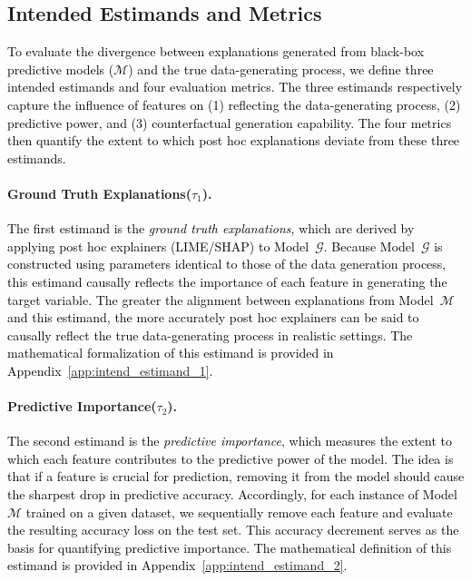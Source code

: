 \documentclass[mnsc,blindrev]{informs3}
\begin{document}
\subsection{Intended Estimands and Metrics}
\label{sec:intended_estimands_and_metrics}

\textcolor{black}{To evaluate the divergence between explanations generated from black-box predictive models ($\mathcal{M}$) and the true data-generating process, we define three intended estimands and four evaluation metrics. The three estimands respectively capture the influence of features on (1) reflecting the data-generating process, (2) predictive power, and (3) counterfactual generation capability. The four metrics then quantify the extent to which post hoc explanations deviate from these three estimands.}

\paragraph{Ground Truth Explanations($\tau_1$).}  
\textcolor{black}{The first estimand is the \textit{ground truth explanations}, which are derived by applying post hoc explainers (LIME/SHAP) to Model~$\mathcal{G}$. Because Model~$\mathcal{G}$ is constructed using parameters identical to those of the data generation process, this estimand causally reflects the importance of each feature in generating the target variable. The greater the alignment between explanations from Model~$\mathcal{M}$ and this estimand, the more accurately post hoc explainers can be said to causally reflect the true data-generating process in realistic settings. The mathematical formalization of this estimand is provided in Appendix~\ref{app:intend_estimand_1}.}

\paragraph{Predictive Importance($\tau_2$).}  
\textcolor{black}{The second estimand is the \textit{predictive importance}, which measures the extent to which each feature contributes to the predictive power of the model. The idea is that if a feature is crucial for prediction, removing it from the model should cause the sharpest drop in predictive accuracy. Accordingly, for each instance of Model~$\mathcal{M}$ trained on a given dataset, we sequentially remove each feature and evaluate the resulting accuracy loss on the test set. This accuracy decrement serves as the basis for quantifying predictive importance. The mathematical definition of this estimand is provided in Appendix~\ref{app:intend_estimand_2}.}
\end{document}
